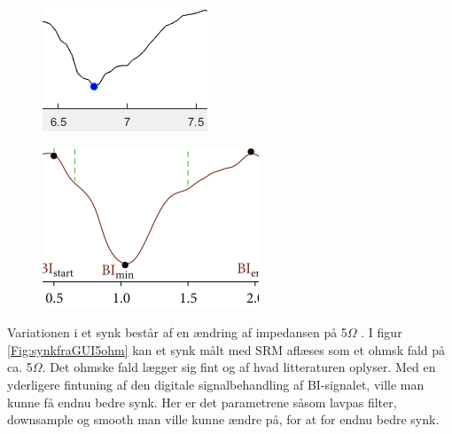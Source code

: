 \begin{figure}[H]
\centering
\begin{minipage}{.5\textwidth}
  \centering
  \includegraphics[width=.7\linewidth]{Figure/synkfraGUI}
  \label{fig:synkfraGUI}
\end{minipage}%
\begin{minipage}{.5\textwidth}
  \centering
  \includegraphics[width=.7\linewidth]{Figure/synkfraArtikel}
  \label{fig:synkfraArtikel}
\end{minipage}
\end{figure}

Variationen i et synk består af en ændring af impedansen på 5$\Omega$ \cite[s. 49]{Chester2014}. I figur \ref{Fig:synkfraGUI5ohm} kan et synk målt med SRM aflæses som et ohmsk fald på ca. 5$\Omega$. Det ohmske fald lægger sig fint og af hvad litteraturen oplyser\cite[s. 49]{Chester2014}. Med en yderligere fintuning af den digitale signalbehandling af BI-signalet, ville man kunne få endnu bedre synk. Her er det parametrene såsom lavpas filter, downsample og smooth man ville kunne ændre på, for at for endnu bedre synk.

